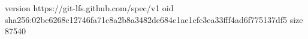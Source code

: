 version https://git-lfs.github.com/spec/v1
oid sha256:02bc6268c12746fa71c8a2b8a3482de684c1ae1cfc3ea33fff4ad6f775137df5
size 87540
